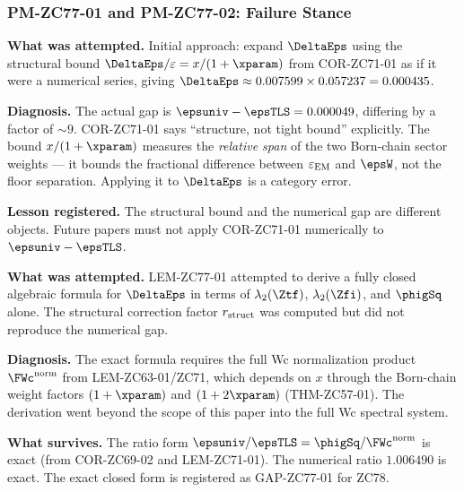 \documentclass[12pt, a4paper]{article}
\renewcommand{\epsEM}{\varepsilon_{\rm EM}}
\begin{document}
\subsubsection{PM-ZC77-01 and PM-ZC77-02: Failure Stance}
\label{sec:pm}

\begin{openqbox}[title={PM-ZC77-01: The $x/(1+x)$ Bound Misread as
  Series for $\DeltaEps$ (pattern: approximation misclassified)}]

\textbf{What was attempted.}
Initial approach: expand $\DeltaEps$ using the structural bound
$\DeltaEps/\varepsilon = x/(1+\xparam)$ from COR-ZC71-01 as if it
were a numerical series, giving
$\DeltaEps \approx 0.007599 \times 0.057237 = 0.000435$.

\textbf{Diagnosis.}
The actual gap is $\epsuniv - \epsTLS = 0.000049$, differing by a
factor of $\sim 9$. COR-ZC71-01 says ``structure, not tight bound''
explicitly. The bound $x/(1+\xparam)$ measures the \emph{relative span}
of the two Born-chain sector weights --- it bounds the fractional
difference between $\epsEM$ and $\epsW$, not the floor separation.
Applying it to $\DeltaEps$ is a category error.

\textbf{Lesson registered.}
The structural bound and the numerical gap are different objects. Future
papers must not apply COR-ZC71-01 numerically to $\epsuniv - \epsTLS$.
\end{openqbox}

\begin{openqbox}[title={PM-ZC77-02: Exact $\FWc^{\rm norm}$ Formula
  Not Closed in This Paper (pattern: scope creep)}]

\textbf{What was attempted.}
LEM-ZC77-01 attempted to derive a fully closed algebraic formula for
$\DeltaEps$ in terms of $\lambda_2(\Ztf)$, $\lambda_2(\Zfi)$, and
$\phigSq$ alone. The structural correction factor $r_{\rm struct}$ was
computed but did not reproduce the numerical gap.

\textbf{Diagnosis.}
The exact formula requires the full Wc normalization product
$\FWc^{\rm norm}$ from LEM-ZC63-01/ZC71, which depends on $x$ through
the Born-chain weight factors $(1+\xparam)$ and $(1+2\xparam)$
(THM-ZC57-01). The derivation went beyond the scope of this paper
into the full Wc spectral system.

\textbf{What survives.}
The ratio form $\epsuniv/\epsTLS = \phigSq/\FWc^{\rm norm}$ is exact
(from COR-ZC69-02 and LEM-ZC71-01). The numerical ratio $1.006490$ is
exact. The exact closed form is registered as GAP-ZC77-01 for ZC78.
\end{openqbox}
\end{document}
